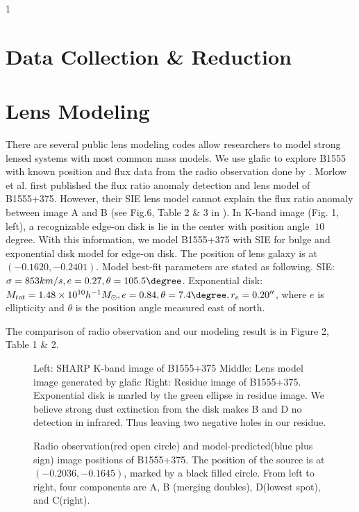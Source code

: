 1\documentclass[manuscript]{emulateapj}
\begin{document}
\section{Data Collection \& Reduction}

\section{Lens Modeling}
There are several public lens modeling codes allow researchers to model strong lensed systems with most common mass models. We use glafic \citep{Oguri} to explore B1555 with known position and flux data from the radio observation done by \citet{Marlow}. Morlow et al. first published the flux ratio anomaly detection and lens model of B1555+375. However, their SIE lens model cannot explain the flux ratio anomaly between image A and B (see Fig.6, Table 2 \& 3 in \citet{Marlow}). In K-band image (Fig. 1, left), a recognizable edge-on disk is lie in the center with position angle $~10$ degree. With this information, we model B1555+375 with SIE for bulge and exponential disk model for edge-on disk. The position of lens galaxy is at $(-0.1620, -0.2401)$. Model best-fit parameters are stated as following. 
SIE: $\sigma =853 km/s, e=0.27, \theta = 105.5 \degree$. 
Exponential disk: $M_{tot}=1.48 \times 10^{10} h^{-1} M_{\odot}, e=0.84, \theta=7.4 \degree, r_e = 0.20'' $, where $e$ is ellipticity and $\theta$ is the position angle measured east of north.

The comparison of radio observation and our modeling result is in Figure 2, Table 1 \& 2.\\

\begin{figure}
\caption{Left: SHARP K-band image of B1555+375 Middle: Lens model image generated by glafic Right: Residue image of B1555+375.\\
Exponential disk is marled by the green ellipse in residue image. We believe strong dust extinction from the disk makes B and D no detection in infrared. Thus leaving two negative holes in our residue.\label{fig1}}
\end{figure}

\begin{figure}
\caption{Radio observation(red open circle) and model-predicted(blue plus sign) image positions of B1555+375. The position of the source is at $(-0.2036,-0.1645)$, marked by a black filled circle. From left to right, four components are A, B (merging doubles), D(lowest spot), and C(right).\label{fig2}}
\end{figure}
\end{document}
